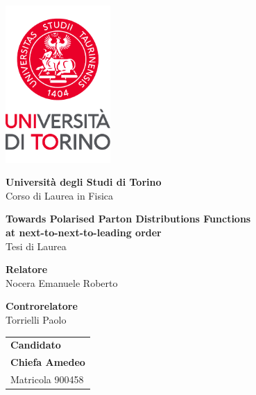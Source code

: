 \begin{titlepage}
  \centering
  \vspace*{0.5cm}

  \includegraphics[width=0.3\textwidth]{./images/newlogo.pdf}

  \vspace{1.5cm}

  \LARGE
  \textbf{Università degli Studi di Torino}\\

  \vspace{1mm}
  Corso di Laurea in Fisica
        
  \vspace{2cm}

  \textbf{Towards Polarised Parton Distributions Functions}\\
  \textbf{at next-to-next-to-leading order}\\
  Tesi di Laurea\\

  \vfill

  \raggedright

  \large

  \textbf{Relatore}\\
  Nocera Emanuele Roberto\\

  \vspace{10mm}

  \textbf{Controrelatore}\\
  Torrielli Paolo\\

  \vspace{5mm}

  \begin{flushright}
    \begin{tabular}{@{}l@{}}
      \textbf{Candidato}\\
      \textbf{Chiefa Amedeo}\\
      Matricola 900458
      \end{tabular}
  \end{flushright}


\end{titlepage}